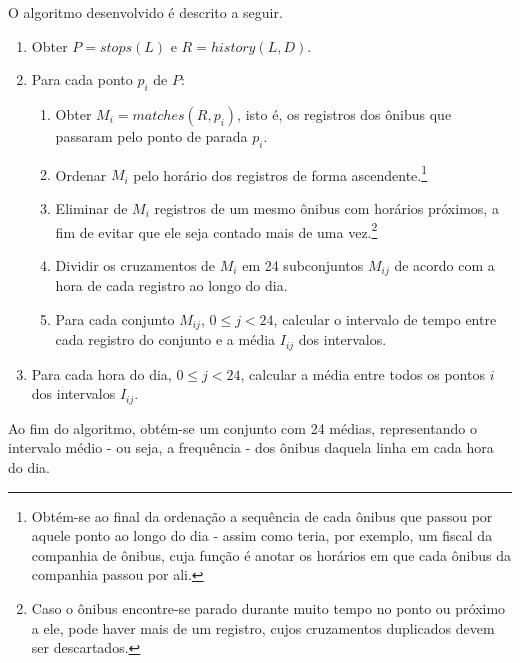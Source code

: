 O algoritmo desenvolvido é descrito a seguir.

\begin{enumerate}

\item Obter $P = stops(L)$ e $R = history(L,D)$.

\item Para cada ponto $p_i$ de $P$: 

    \begin{enumerate}
        \item Obter $M_i = matches(R,p_i)$, isto é, os registros dos ônibus que passaram pelo ponto de parada $p_i$.
        
        \item Ordenar $M_i$ pelo horário dos registros de forma ascendente.\footnote{Obtém-se ao final da ordenação a sequência de cada ônibus que passou por aquele ponto ao longo do dia - assim como teria, por exemplo, um fiscal da companhia de ônibus, cuja função é anotar os horários em que cada ônibus da companhia passou por ali.}
        
        \item Eliminar de $M_i$ registros de um mesmo ônibus com horários próximos, a fim de evitar que ele seja contado mais de uma vez.\footnote{Caso o ônibus encontre-se parado durante muito tempo no ponto ou próximo a ele, pode haver mais de um registro, cujos cruzamentos duplicados devem ser descartados.}
        
        \item Dividir os cruzamentos de $M_i$ em 24 subconjuntos $M_{ij}$ de acordo com a hora de cada registro ao longo do dia.
        
        \item Para cada conjunto $M_{ij}$, $0 \leq j < 24$, calcular o intervalo de tempo entre cada registro do conjunto e a média $I_{ij}$ dos intervalos.
        
    \end{enumerate}
    
\item Para cada hora do dia, $0 \leq j < 24$, calcular a média entre todos os pontos $i$ dos intervalos $I_{ij}$. 

\end{enumerate}

Ao fim do algoritmo, obtém-se um conjunto com 24 médias, representando o intervalo médio - ou seja, a frequência - dos ônibus daquela linha em cada hora do dia.

